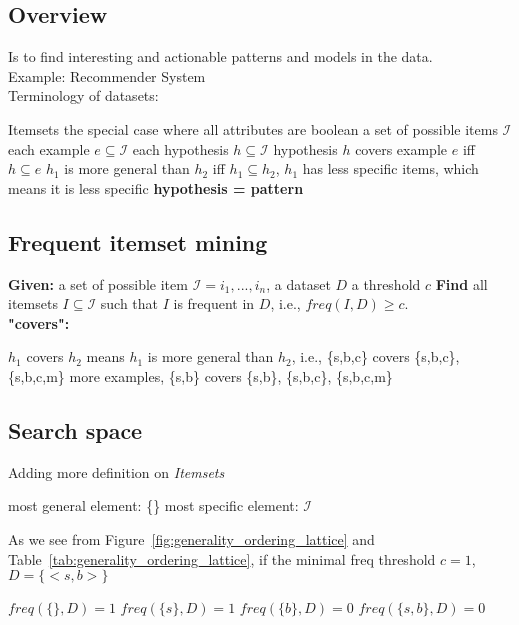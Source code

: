 \subsection{Overview}
Is to find interesting and actionable patterns and models in the data. \\

\noindent
Example: Recommender System \\
Terminology of datasets:
\begin{outline}
    \1 Itemsets
        \2 the special case where all attributes are boolean
        \2 a set of possible items $\mathscr{I}$
        \2 each example $e \subseteq \mathscr{I}$
        \2 each hypothesis $h \subseteq \mathscr{I}$
        \2 hypothesis $h$ covers example $e$ iff $h \subseteq e$ 
        \2 $h_{1}$ is more general than $h_{2}$ iff $h_{1} \subseteq h_{2}$, $h_{1}$ has less specific items, which means it is less specific
        \2 \textbf{hypothesis = pattern}
\end{outline}

\subsection{Frequent itemset mining}
\tabto{0mm} \textbf{Given:}
\tabto{5mm} a set of possible item $\mathscr{I} = {i_{1},...,i_{n}}$,
\tabto{5mm} a dataset $D$
\tabto{5mm} a threshold $c$
\tabto{0mm} \textbf{Find} all itemsets $I \subseteq \mathscr{I}$ such that $I$ is frequent in $D$, i.e., $freq(I,D) \ge c$. \\ 

\noindent
\textbf{"covers":} 
\begin{outline}
    \1 $h_{1}$ covers $h_{2}$ means $h_{1}$ is more general than $h_{2}$, i.e., \{s,b,c\} covers \{s,b,c\}, \{s,b,c,m\}
    \1 more examples, \{s,b\} covers \{s,b\}, \{s,b,c\}, \{s,b,c,m\}
\end{outline}

\subsection{Search space}
Adding more definition on \emph{Itemsets}
\begin{outline}
    \1 most general element: \{\}
    \1 most specific element: $\mathscr{I}$
\end{outline}

\noindent
As we see from Figure~\ref{fig:generality_ordering_lattice} and Table~\ref{tab:generality_ordering_lattice}, if the minimal freq threshold $c = 1$, $D = \{<s,b>\}$
\begin{outline}
    \1 $freq(\{\},D) = 1$
    \1 $freq(\{s\},D) = 1$
    \1 $freq(\{b\},D) = 0$
    \1 $freq(\{s,b\},D) = 0$
\end{outline}

